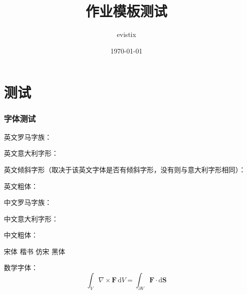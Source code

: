 \documentclass[theme = fancy, zihao = 5]{work-template}
\title{作业模板测试}
\author{evistix}
\date{\today}
\begin{document}
\maketitle

\part{测试}
\section{字体测试}

英文罗马字族：\\
\lipsum[1]

英文意大利字形：\\
{\itshape \lipsum[1] }

英文倾斜字形（取决于该英文字体是否有倾斜字形，没有则与意大利字形相同）：\\
{\slshape \lipsum[1]}

英文粗体：\\
{\bfseries \lipsum[1]}

中文罗马字族：\\
\zhlipsum[1]

中文意大利字形：\\
{\itshape \zhlipsum[1] }

中文粗体：\\
{\bfseries \zhlipsum[1] }

{\songti 宋体} {\kaishu 楷书} {\fangsong 仿宋} {\heiti 黑体}

数学字体：
\begin{equation}
    \int_V \nabla\times \symbf F\,\mathrm{d}V = \int_{\partial V} \symbf F\cdot\mathrm{d}\symbf S 
\end{equation}
\end{document}
